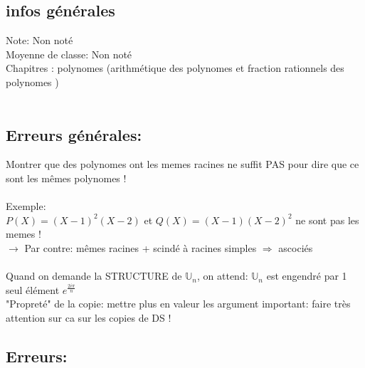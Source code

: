 \documentclass{book}
\begin{document}
\begin{tcolorbox}[width={14cm},colback={yellow!20!white},title={\textbf{Commentaire générale sur ce DM}},colbacktitle=red!40!white,coltitle=black]    

\end{tcolorbox}


\subsection{infos générales}

Note: Non noté \\
Moyenne de classe: Non noté \\

Chapitres : polynomes (arithmétique des polynomes et fraction rationnels des polynomes
) \\ \\

\subsection{Erreurs générales: } 

Montrer que des polynomes ont les memes racines ne suffit PAS pour dire que ce sont les mêmes polynomes ! \\ \\
Exemple: \\

$P(X) = (X-1)^2(X-2)$ et $Q(X) = (X-1)(X-2)^2$ ne sont pas les memes ! \\

\hspace{0.5cm} $\rightarrow$ Par contre: mêmes racines  + scindé à racines simples $\Rightarrow$ ascociés \\ \\


Quand on demande la STRUCTURE de $\mathbb{U}_n$, on attend: $\mathbb{U}_n$ est engendré par 1 seul élément $e^{ \frac{2i\pi}{n} }$ \\

"Propreté" de la copie: mettre plus en valeur les argument important: faire très attention sur ca sur les copies de DS ! \\

\subsection{Erreurs:}

\vspace{0.5cm}
\end{document}
